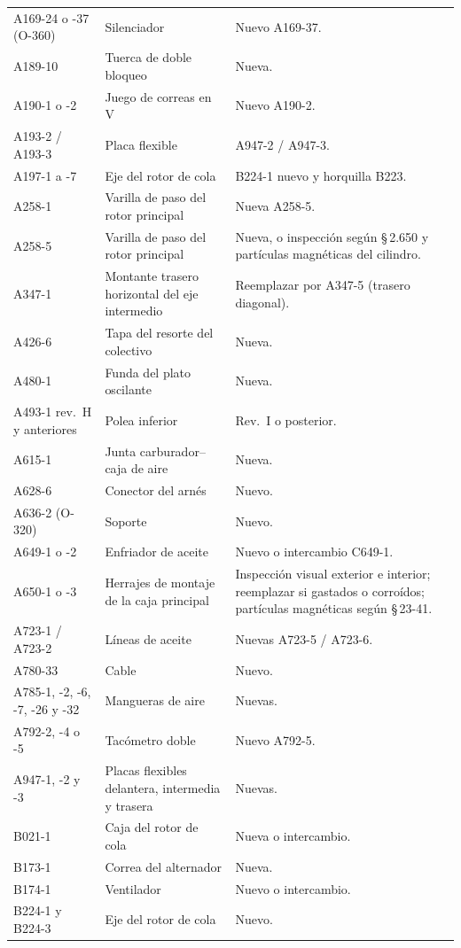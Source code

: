 {\begin{longtable}{@{}p{2.1cm}p{2.6cm}p{\dimexpr\linewidth-4.7cm-4\tabcolsep}@{}}
A169-24 o -37 (O-360) & Silenciador & Nuevo A169-37. \\
A189-10 & Tuerca de doble bloqueo & Nueva. \\
A190-1 o -2 & Juego de correas en V & Nuevo A190-2. \\
A193-2 / A193-3 & Placa flexible & A947-2 / A947-3. \\
A197-1 a -7 & Eje del rotor de cola & B224-1 nuevo y horquilla B223. \\
A258-1 & Varilla de paso del rotor principal & Nueva A258-5. \\
A258-5 & Varilla de paso del rotor principal & Nueva, o inspección según \S\,2.650 y partículas magnéticas del cilindro. \\
A347-1 & Montante trasero horizontal del eje intermedio & Reemplazar por A347-5 (trasero diagonal). \\
A426-6 & Tapa del resorte del colectivo & Nueva. \\
A480-1 & Funda del plato oscilante & Nueva. \\
A493-1 rev.~H y anteriores & Polea inferior & Rev.~I o posterior. \\
A615-1 & Junta carburador--caja de aire & Nueva. \\
A628-6 & Conector del arnés & Nuevo. \\
A636-2 (O-320) & Soporte & Nuevo. \\
A649-1 o -2 & Enfriador de aceite & Nuevo o intercambio C649-1. \\
A650-1 o -3 & Herrajes de montaje de la caja principal & Inspección visual exterior e interior; reemplazar si gastados o corroídos; partículas magnéticas según \S\,23-41. \\
A723-1 / A723-2 & Líneas de aceite & Nuevas A723-5 / A723-6. \\
A780-33 & Cable & Nuevo. \\
A785-1, -2, -6, -7, -26 y -32 & Mangueras de aire & Nuevas. \\
A792-2, -4 o -5 & Tacómetro doble & Nuevo A792-5. \\
A947-1, -2 y -3 & Placas flexibles delantera, intermedia y trasera & Nuevas. \\
B021-1 & Caja del rotor de cola & Nueva o intercambio. \\
B173-1 & Correa del alternador & Nueva. \\
B174-1 & Ventilador & Nuevo o intercambio. \\
B224-1 y B224-3 & Eje del rotor de cola & Nuevo. \\

\end{longtable}}
